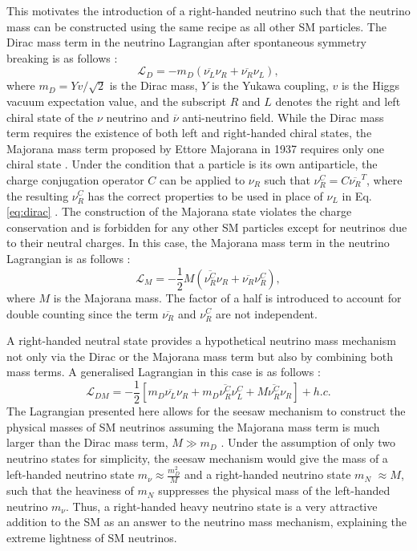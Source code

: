 This motivates the introduction of a right-handed neutrino such that the neutrino mass can be constructed using the same recipe as all other SM particles.
The Dirac mass term in the neutrino Lagrangian after spontaneous symmetry breaking is as follows \cite{Thomson}:
\begin{equation}
\mathcal{L}_{D} = -m_{D} \left(\overline{\nu_{L}}\nu_{R} + \overline{\nu_{R}}\nu_{L}\right),
\label{eq:dirac}
\end{equation}
where $m_{D} = Yv/\sqrt{2}$ is the Dirac mass, $Y$ is the Yukawa coupling, $v$ is the Higgs vacuum expectation value, and the subscript $R$ and $L$ denotes the right and left chiral state of the $\nu$ neutrino and $\overline{\nu}$ anti-neutrino field. 
While the Dirac mass term requires the existence of both left and right-handed chiral states, the Majorana mass term proposed by Ettore Majorana in 1937 requires only one chiral state \cite{Majorana}.
Under the condition that a particle is its own antiparticle, the charge conjugation operator $C$ can be applied to $\nu_R$ such that $\nu^{C}_{R}=C\overline{\nu_{R}}^{T}$, where the resulting $\nu_R^C$ has the correct properties to be used in place of $\nu_L$ in Eq. \ref{eq:dirac} \cite{Kim}.
The construction of the Majorana state violates the charge conservation and is forbidden for any other SM particles except for neutrinos due to their neutral charges. 
In this case, the Majorana mass term in the neutrino Lagrangian is as follows \cite{Kim}:
\begin{equation}
	\mathcal{L}_{M} = -\frac{1}{2}M\left(\overline{\nu_{R}^{C}}\nu_{R} + \overline{\nu_{R}}\nu_{R}^{C}\right),
\end{equation}
where $M$ is the Majorana mass. 
The factor of a half is introduced to account for double counting since the term $\overline{\nu_R}$ and $\nu^C_R$ are not independent.

A right-handed neutral state provides a hypothetical neutrino mass mechanism not only via the Dirac or the Majorana mass term but also by combining both mass terms.
A generalised Lagrangian in this case is as follows \cite{Thomson}:
\begin{equation}
        \mathcal{L}_{DM} = -\frac{1}{2}\left[m_D\overline{\nu_{L}}\nu_{R} + m_D\overline{\nu_{R}^{C}}\nu_{L}^C + M\overline{\nu_{R}^{C}}\nu_{R}\right] + h.c.
\end{equation}
The Lagrangian presented here allows for the seesaw mechanism to construct the physical masses of SM neutrinos assuming the Majorana mass term is much larger than the Dirac mass term, $M \gg m_D$ \cite{Thomson, nuMass}.
Under the assumption of only two neutrino states for simplicity, the seesaw mechanism would give the mass of a left-handed neutrino state $m_{\nu} \approx \frac{m_D^2}{M}$ and a right-handed neutrino state $m_N$ $\approx M$, such that the heaviness of $m_N$ suppresses the physical mass of the left-handed neutrino $m_\nu$.
Thus, a right-handed heavy neutrino state is a very attractive addition to the SM as an answer to the neutrino mass mechanism, explaining the extreme lightness of SM neutrinos.


